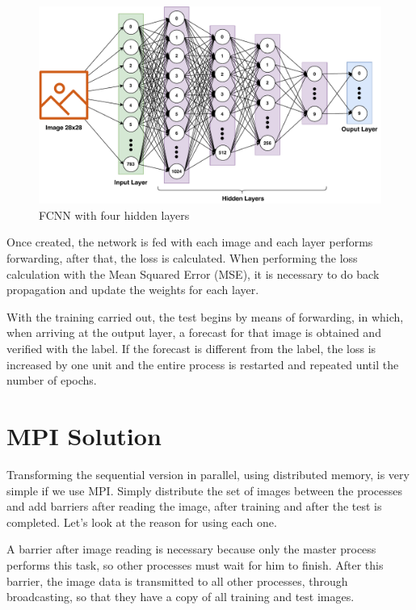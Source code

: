 \documentclass[conference]{IEEEtran}
\begin{document}
\begin{figure}
    \centering
    \includegraphics[width=\columnwidth]{images/FCNN.pdf}
    \caption{FCNN with four hidden layers}
    \label{fig:arq}
\end{figure}

Once created, the network is fed with each image and each layer performs forwarding, after that, the loss is calculated. When performing the loss calculation with the Mean Squared Error (MSE)\cite{lehmann2006theory}, it is necessary to do back propagation and update the weights for each layer.

With the training carried out, the test begins by means of forwarding, in which, when arriving at the output layer, a forecast for that image is obtained and verified with the label. If the forecast is different from the label, the loss is increased by one unit and the entire process is restarted and repeated until the number of epochs.

\section{MPI Solution}\label{sec:mpiversion}

Transforming the sequential version in parallel, using distributed memory, is very simple if we use MPI. Simply distribute the set of images between the processes and add barriers after reading the image, after training and after the test is completed. Let's look at the reason for using each one.

A barrier after image reading is necessary because only the master process performs this task, so other processes must wait for him to finish. After this barrier, the image data is transmitted to all other processes, through broadcasting, so that they have a copy of all training and test images.
\end{document}
